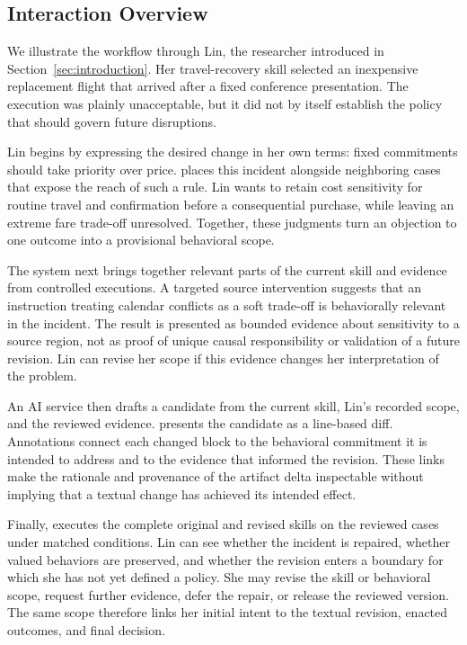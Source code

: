 \subsection{Interaction Overview}
\label{sec:system-walkthrough}

We illustrate the workflow through Lin, the researcher introduced in
Section~\ref{sec:introduction}. Her travel-recovery skill selected an
inexpensive replacement flight that arrived after a fixed conference
presentation. The execution was plainly unacceptable, but it did not by
itself establish the policy that should govern future disruptions.

Lin begins by expressing the desired change in her own terms: fixed
commitments should take priority over price. \systemname{} places this incident
alongside neighboring cases that expose the reach of such a rule. Lin wants to
retain cost sensitivity for routine travel and confirmation before a
consequential purchase, while leaving an extreme fare trade-off unresolved.
Together, these judgments turn an objection to one outcome into a provisional
behavioral scope.

The system next brings together relevant parts of the current skill and
evidence from controlled executions. A targeted source intervention suggests
that an instruction treating calendar conflicts as a soft trade-off is
behaviorally relevant in the incident. The result is presented as bounded
evidence about sensitivity to a source region, not as proof of unique causal
responsibility or validation of a future revision. Lin can revise her scope if
this evidence changes her interpretation of the problem.

An AI service then drafts a candidate from the current skill, Lin's recorded
scope, and the reviewed evidence. \systemname{} presents the candidate as a
line-based diff. Annotations connect each changed block to the behavioral
commitment it is intended to address and to the evidence that informed the
revision. These links make the rationale and provenance of the artifact delta
inspectable without implying that a textual change has achieved its intended
effect.

Finally, \systemname{} executes the complete original and revised skills on
the reviewed cases under matched conditions. Lin can see whether the incident
is repaired, whether valued behaviors are preserved, and whether the revision
enters a boundary for which she has not yet defined a policy. She may revise
the skill or behavioral scope, request further evidence, defer the repair, or
release the reviewed version. The same scope therefore links her initial
intent to the textual revision, enacted outcomes, and final decision.

